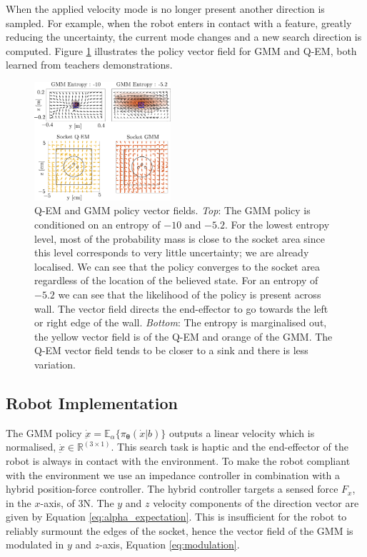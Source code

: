 \documentclass[final,5p,times,twocolumn]{elsarticle}
\newcommand{\Param}{\boldsymbol{\theta}}
\begin{document}
When the applied velocity mode is no longer present another direction is sampled. For example, when the robot enters in contact 
with a feature, greatly reducing the uncertainty, the current mode changes and a new search direction is computed. 
Figure \ref{fig:policy_vf} illustrates the policy vector field for GMM and Q-EM, both learned from teachers demonstrations.

\begin{figure}
   \includegraphics[width=0.45\textwidth]{./Figures/Fig/policy_vf.pdf}
  \caption{Q-EM and GMM policy vector fields. \textit{Top}: The GMM policy is conditioned on an entropy of $-10$ and $-5.2$. For the lowest entropy level,
  most of the probability mass is close to the socket area since this level corresponds to very little uncertainty; we are already localised. We can see 
  that the policy converges to the socket area regardless of the location of the believed state. For an entropy of $-5.2$ we can see that 
  the likelihood of the policy is present across wall. The vector field directs the end-effector to go towards the left or right edge of the wall. 
  \textit{Bottom}: The entropy is marginalised out, the yellow vector field is of the Q-EM and orange of the GMM. The Q-EM vector field tends 
  to be closer to a sink and there is less variation.}
  \label{fig:policy_vf}
\end{figure}

\subsection{Robot Implementation}

The GMM policy $\dot{\underbar{x}} = \mathbb{E}_{\alpha}\{\pi_{\Param}(\dot{x}|b)\}$ outputs a linear velocity which 
is normalised, $\dot{\underbar{x}} \in \mathbb{R}^{(3 \times 1)}$.
This search task is haptic and the end-effector of the robot is always in contact with the environment. To make the robot
compliant with the environment we use an impedance controller in combination with a hybrid position-force controller. The hybrid controller
targets a sensed force $F_x$, in the $x$-axis, of 3N. The $y$ and $z$ velocity components of the direction vector are given by 
Equation \ref{eq:alpha_expectation}. This is insufficient for the robot to reliably surmount the edges of the socket,
hence the vector field of the GMM is modulated in $y$ and $z$-axis, Equation \ref{eq:modulation}.
\end{document}
